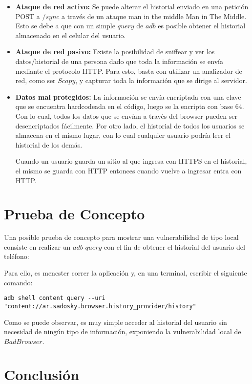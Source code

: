 \documentclass[10pt, a4paper]{article}
\begin{document}
\begin{itemize}
\item \textbf{Ataque de red activo:} Se puede alterar el historial enviado en una petición POST a $/sync$ a través de un ataque man in the middle Man in The Middle. Esto se debe a que con un simple $query$ de $adb$ es posible obtener el historial almacenado en el celular del usuario.

\item \textbf{Ataque de red pasivo:} Existe la posibilidad de sniffear y ver los datos/historial de una persona dado que toda la información se envía mediante el protocolo HTTP. Para esto, basta con utilizar un analizador de red, como ser $Scapy$, y capturar toda la información que se dirige al servidor.

\item \textbf{Datos mal protegidos:} La información se envía encriptada con una clave que se encuentra hardcodeada en el código, luego se la encripta con base 64. Con lo cual, todos los datos que se envían a través del browser pueden ser desencriptados fácilmente. Por otro lado, el historial de todos los usuarios se almacena en el mismo lugar, con lo cual cualquier usuario podría leer el historial de los demás.

Cuando un usuario guarda un sitio al que ingresa con HTTPS en el historial, el mismo se guarda con HTTP entonces cuando vuelve a ingresar entra con HTTP.


\end{itemize}

\newpage
\section{Prueba de Concepto}

Una posible prueba de concepto para mostrar una vulnerabilidad de tipo local consiste en realizar un $adb$ $query$ con el fin de obtener el historial del usuario del teléfono:

Para ello, es menester correr la aplicación y, en una terminal, escribir el siguiente comando:

\begin{verbatim}
adb shell content query --uri "content://ar.sadosky.browser.history_provider/history"
\end{verbatim}

Como se puede observar, es muy simple acceder al historial del usuario sin necesidad de ningún tipo de información, exponiendo la vulnerabilidad local de $BadBrowser$.

\newpage
\section{Conclusión}
\end{document}
